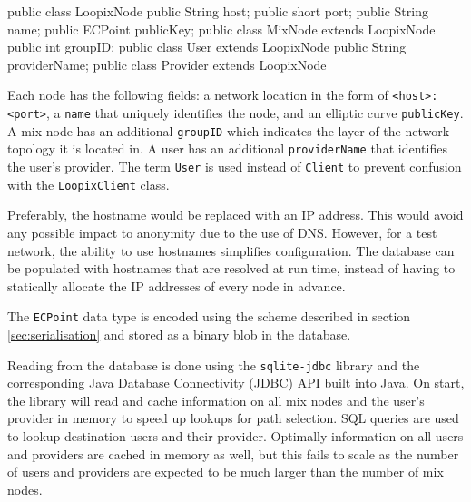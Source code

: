 \documentclass[final,dissertation.tex]{subfiles}
\begin{document}
\begin{javacode}
public class LoopixNode {
    public String host;
    public short port;
    public String name;
    public ECPoint publicKey;
}
public class MixNode extends LoopixNode {
	public int groupID;
}
public class User extends LoopixNode {
    public String providerName;
}
public class Provider extends LoopixNode { }
\end{javacode}

Each node has the following fields: a network location in the form of \verb|<host>:<port>|, a \verb|name| that uniquely identifies the node, and an elliptic curve \verb|publicKey|. A mix node has an additional \verb|groupID| which indicates the layer of the network topology it is located in. A user has an additional \verb|providerName| that identifies the user's provider. The term \verb|User| is used instead of \verb|Client| to prevent confusion with the \verb|LoopixClient| class.

Preferably, the hostname would be replaced with an IP address. This would avoid any possible impact to anonymity due to the use of DNS. However, for a test network, the ability to use hostnames simplifies configuration. The database can be populated with hostnames that are resolved at run time, instead of having to statically allocate the IP addresses of every node in advance.


The \verb|ECPoint| data type is encoded using the scheme described in section \ref{sec:serialisation} and stored as a binary blob in the database.

Reading from the database is done using the \verb|sqlite-jdbc| library and the corresponding Java Database Connectivity (JDBC)
API built into Java. On start, the library will read and cache information on all mix nodes and the user's provider in memory to speed up lookups for path selection. SQL queries are used to lookup destination users and their provider. Optimally information on all users and providers are cached in memory as well, but this fails to scale as the number of users and providers are expected to be much larger than the number of mix nodes.
\end{document}
